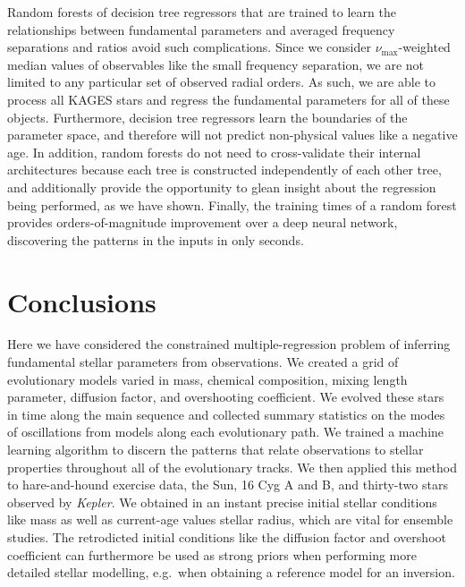\documentclass[manuscript]{aastex}
\begin{document}
Random forests of decision tree regressors that are trained to learn the relationships between fundamental parameters and averaged frequency separations and ratios avoid such complications. Since we consider $\nu_{\max}$-weighted median values of observables like the small frequency separation, we are not limited to any particular set of observed radial orders. As such, we are able to process all KAGES stars and regress the fundamental parameters for all of these objects. Furthermore, decision tree regressors learn the boundaries of the parameter space, and therefore will not predict non-physical values like a negative age. In addition, random forests do not need to cross-validate their internal architectures because each tree is constructed independently of each other tree, and additionally provide the opportunity to glean insight about the regression being performed, as we have shown. Finally, the training times of a random forest provides orders-of-magnitude improvement over a deep neural network, discovering the patterns in the inputs in only seconds. %

\section{Conclusions}
Here we have considered the constrained multiple-regression problem of inferring fundamental stellar parameters from observations. We created a grid of evolutionary models varied in mass, chemical composition, mixing length parameter, diffusion factor, and overshooting coefficient. We evolved these stars in time along the main sequence and collected summary statistics on the modes of oscillations from models along each evolutionary path. We trained a machine learning algorithm to discern the patterns that relate observations to stellar properties throughout all of the evolutionary tracks. We then applied this method to hare-and-hound exercise data, the Sun, 16 Cyg A and B, and thirty-two stars observed by \emph{Kepler}. We obtained in an instant precise initial stellar conditions like mass as well as current-age values stellar radius, which are vital for ensemble studies. The retrodicted initial conditions like the diffusion factor and overshoot coefficient can furthermore be used as strong priors when performing more detailed stellar modelling, e.g.~when obtaining a reference model for an inversion. 
\end{document}
